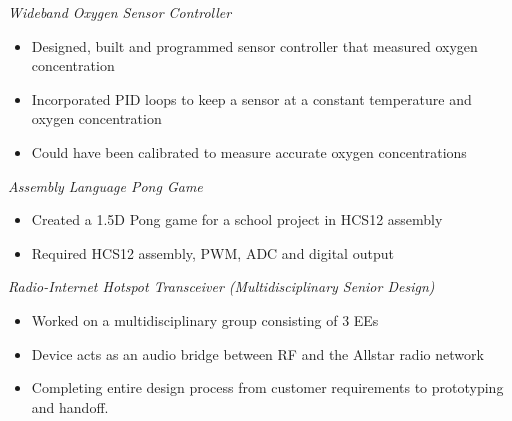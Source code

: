 \documentclass[line,margin]{res}
\begin{document}
\begin{resume}
	\vspace{-10pt}
	{\sl Wideband Oxygen Sensor Controller}
		\begin{itemize} \itemsep -2pt
			\item Designed, built and programmed sensor controller that measured oxygen concentration
			\item Incorporated PID loops to keep a sensor at a constant temperature and oxygen concentration
			\item Could have been calibrated to measure accurate oxygen concentrations
		\end{itemize}


	\vspace{-10pt}
	{\sl Assembly Language Pong Game}
		\begin{itemize} \itemsep -2pt
			\item Created a 1.5D Pong game for a school project in HCS12 assembly
			\item Required HCS12 assembly, PWM, ADC and digital output
		\end{itemize}
	\vspace{-10pt}
	{\sl Radio-Internet Hotspot Transceiver (Multidisciplinary Senior Design)}
		\begin{itemize} \itemsep -2pt
			\item Worked on a multidisciplinary group consisting of 3 EEs
			\item Device acts as an audio bridge between RF and the Allstar radio network
			\item Completing entire design process from customer requirements to prototyping and handoff.
		\end{itemize}

\end{resume}
\end{document}
